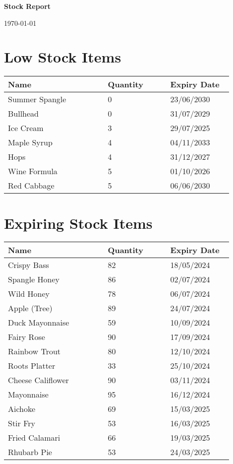 \documentclass{article}
\begin{document}
\noindent
\begin{minipage}[t]{0.48\textwidth}
	\raggedright
	\LARGE \textbf{Stock Report}
\end{minipage}
\begin{minipage}[t]{0.48\textwidth}
	\raggedleft
	\large \today
\end{minipage}
\vspace{1.5em}
\section*{Low Stock Items}
\begin{longtable}{|p{0.4\linewidth}|p{0.25\linewidth}|p{0.25\linewidth}|}\hline
\textbf{Name} & \textbf{Quantity} & \textbf{Expiry Date}\\
\hline
Summer Spangle & 0 & 23/06/2030 \\
\hline
Bullhead & 0 & 31/07/2029 \\
\hline
Ice Cream & 3 & 29/07/2025 \\
\hline
Maple Syrup & 4 & 04/11/2033 \\
\hline
Hops & 4 & 31/12/2027 \\
\hline
Wine Formula & 5 & 01/10/2026 \\
\hline
Red Cabbage & 5 & 06/06/2030 \\
\hline
\end{longtable}

\section*{Expiring Stock Items}
\begin{longtable}{|p{0.4\linewidth}|p{0.25\linewidth}|p{0.25\linewidth}|}\hline
\textbf{Name} & \textbf{Quantity} & \textbf{Expiry Date}\\
\hline
Crispy Bass & 82 & 18/05/2024 \\
\hline
Spangle Honey & 86 & 02/07/2024 \\
\hline
Wild Honey & 78 & 06/07/2024 \\
\hline
Apple (Tree) & 89 & 24/07/2024 \\
\hline
Duck Mayonnaise & 59 & 10/09/2024 \\
\hline
Fairy Rose & 90 & 17/09/2024 \\
\hline
Rainbow Trout & 80 & 12/10/2024 \\
\hline
Roots Platter & 33 & 25/10/2024 \\
\hline
Cheese Califlower & 90 & 03/11/2024 \\
\hline
Mayonnaise & 95 & 16/12/2024 \\
\hline
Aichoke & 69 & 15/03/2025 \\
\hline
Stir Fry & 53 & 16/03/2025 \\
\hline
Fried Calamari & 66 & 19/03/2025 \\
\hline
Rhubarb Pie & 53 & 24/03/2025 \\
\hline
\end{longtable}
\end{document}
